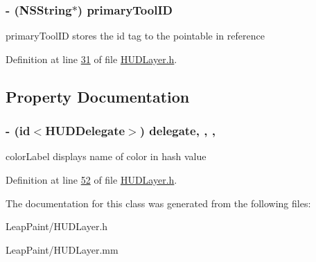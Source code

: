\hypertarget{interface_h_u_d_layer_aae17304a5ecff2a6fa43471edb779341}{
\subsubsection[{primary\-Tool\-I\-D}]{\setlength{\rightskip}{0pt plus 5cm}-\/ (N\-S\-String$\ast$) primary\-Tool\-I\-D\hspace{0.3cm}{\ttfamily [protected]}}}\label{d3/d8a/interface_h_u_d_layer_aae17304a5ecff2a6fa43471edb779341}
primary\-Tool\-I\-D stores the id tag to the pointable in reference 

Definition at line \hyperlink{_h_u_d_layer_8h_source_l00031}{31} of file \hyperlink{_h_u_d_layer_8h_source}{H\-U\-D\-Layer.\-h}.



\subsection{Property Documentation}
\hypertarget{interface_h_u_d_layer_a64cb26c1f8c5a76e8f392a02291c0cf6}{
\subsubsection[{delegate}]{\setlength{\rightskip}{0pt plus 5cm}-\/ (id$<${\bf H\-U\-D\-Delegate}$>$) delegate\hspace{0.3cm}{\ttfamily [read]}, {\ttfamily [write]}, {\ttfamily [nonatomic]}, {\ttfamily [weak]}}}\label{d3/d8a/interface_h_u_d_layer_a64cb26c1f8c5a76e8f392a02291c0cf6}
color\-Label displays name of color in hash value 

Definition at line \hyperlink{_h_u_d_layer_8h_source_l00052}{52} of file \hyperlink{_h_u_d_layer_8h_source}{H\-U\-D\-Layer.\-h}.



The documentation for this class was generated from the following files\-:\begin{DoxyCompactItemize}
\item 
Leap\-Paint/H\-U\-D\-Layer.\-h\item 
Leap\-Paint/H\-U\-D\-Layer.\-mm\end{DoxyCompactItemize}
